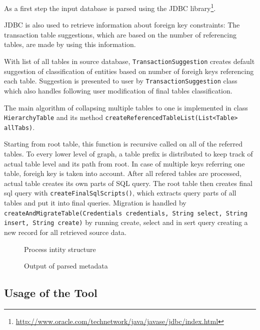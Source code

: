 As a first step the input database is parsed using the JDBC library\footnote{\url{http://www.oracle.com/technetwork/java/javase/jdbc/index.html}}.

JDBC is also used to retrieve information about foreign key constraints: The transaction table suggestions, which are based on the number of referencing tables, are made by using this information.

With list of all tables in source database, \texttt{TransactionSuggestion} creates default suggestion of classification of entities based on number of foreigh keys referencing each table.
Suggestion is presented to user by \texttt{TransactionSuggestion} class which also handles following user modification of final tables classification.

The main algorithm of collapsing multiple tables to one is implemented in class \texttt{HierarchyTable} and its method \texttt{createReferencedTableList(List<Table> allTabs)}.

Starting from root table, this function is recursive called on all of the referred tables. To every lower level of graph, a table prefix is distributed to keep track of actual table level and its path from root.
In case of multiple keys referring one table, foreigh key is taken into account. After all refered tables are processed, actual table creates its own parts of SQL query.
The root table then creates final sql query with \texttt{createFinalSqlScripts()}, which extracts query parts of all tables and put it into final queries.
Migration is handled by \texttt{createAndMigrateTable(Credentials credentials, String select, String insert, String create)} by running create, select and in sert query creating a new record for all retrieved source data.

\begin{figure}
  
  \caption{Process intity structure}
  \label{fig:metadataOutput}
\end{figure}

\begin{figure}[p]
  
  \caption{Output of parsed metadata}
  \label{fig:metadataOutput}
\end{figure}

\subsection{Usage of the Tool}

